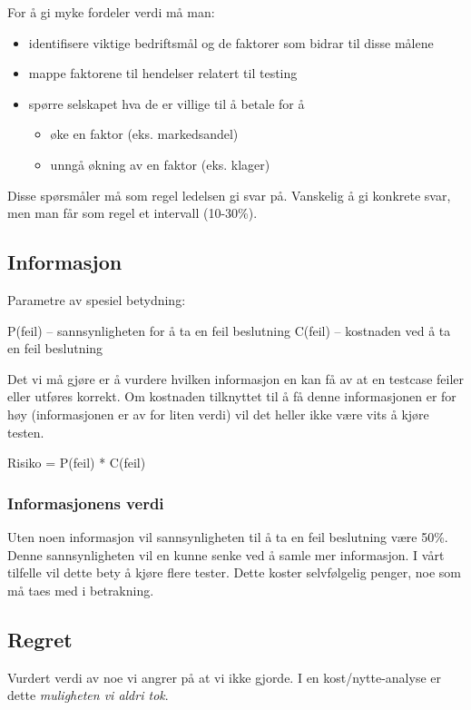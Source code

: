 For å gi myke fordeler verdi må man:

\begin{itemize}
\item
  identifisere viktige bedriftsmål og de faktorer som bidrar til disse
  målene
\item
  mappe faktorene til hendelser relatert til testing
\item
  spørre selskapet hva de er villige til å betale for å
  \begin{itemize}
  \item
    øke en faktor (eks. markedsandel)
  \item
    unngå økning av en faktor (eks. klager)
  \end{itemize}
\end{itemize}
Disse spørsmåler må som regel ledelsen gi svar på. Vanskelig å gi
konkrete svar, men man får som regel et intervall (10-30\%).

\subsection{Informasjon}

Parametre av spesiel betydning:

P(feil) -- sannsynligheten for å ta en feil beslutning C(feil) --
kostnaden ved å ta en feil beslutning

Det vi må gjøre er å vurdere hvilken informasjon en kan få av at en
testcase feiler eller utføres korrekt. Om kostnaden tilknyttet til å få
denne informasjonen er for høy (informasjonen er av for liten verdi) vil
det heller ikke være vits å kjøre testen.

Risiko = P(feil) * C(feil)

\subsubsection{Informasjonens verdi}

Uten noen informasjon vil sannsynligheten til å ta en feil beslutning
være 50\%. Denne sannsynligheten vil en kunne senke ved å samle mer
informasjon. I vårt tilfelle vil dette bety å kjøre flere tester. Dette
koster selvfølgelig penger, noe som må taes med i betrakning.

\subsection{Regret}

Vurdert verdi av noe vi angrer på at vi ikke gjorde. I en
kost/nytte-analyse er dette \emph{muligheten vi aldri tok}.

